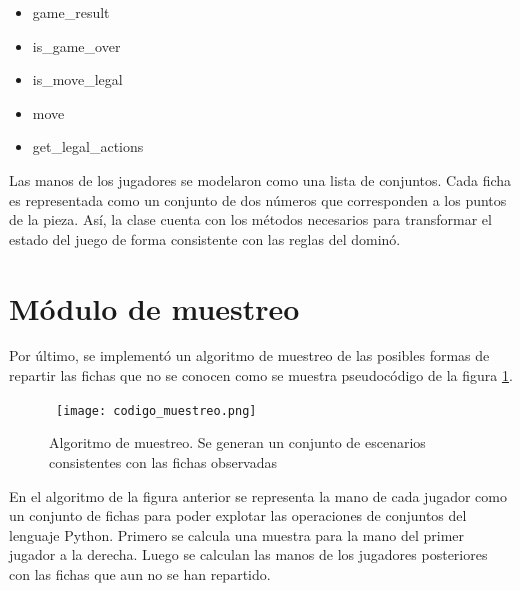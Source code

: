 \begin{itemize}
   \item game\_result
   \item is\_game\_over
   \item is\_move\_legal
   \item move
   \item get\_legal\_actions
\end{itemize}

Las manos de los jugadores se modelaron como una lista de conjuntos. Cada ficha
es representada como un conjunto de dos números que corresponden a los puntos de
la pieza. Así, la clase cuenta con los métodos necesarios para transformar el
estado del juego de forma consistente con las reglas del dominó.

\section{Módulo de muestreo}

Por último, se implementó un algoritmo de muestreo de las posibles formas de
repartir las fichas que no se conocen como se muestra pseudocódigo de la figura
\ref{CM}.

\begin{figure}[ht]
   \begin{center}
      \hbox{\hspace{-1.5em} \texttt{[image: codigo\_muestreo.png]}}
      \caption{Algoritmo de muestreo. Se generan un conjunto de escenarios consistentes con las fichas observadas}
      \label{CM}
   \end{center}
\end{figure}

En el algoritmo de la figura anterior se representa la mano de cada jugador como
un conjunto de fichas para poder explotar las operaciones de conjuntos del
lenguaje Python. Primero se calcula una muestra para la mano del primer jugador
a la derecha. Luego se calculan las manos de los jugadores posteriores con las
fichas que aun no se han repartido.



